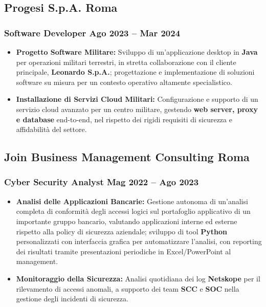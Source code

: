 \documentclass[11pt]{article}
\newcommand{\rside}[1]{
  \hfill {\normalfont\color{accent} #1}%
}
\begin{document}
\subsection{Progesi S.p.A. \rside{Roma}}
\subsubsection{Software Developer \rside{Ago 2023 -- Mar 2024}}
\begin{itemize}
  \item \textbf{Progetto Software Militare:} Sviluppo di un'applicazione desktop in \textbf{Java} per operazioni militari terrestri, in stretta collaborazione con il cliente principale, \textbf{Leonardo S.p.A.}; progettazione e implementazione di soluzioni software su misura per un contesto operativo altamente specialistico.
  \item \textbf{Installazione di Servizi Cloud Militari:} Configurazione e supporto di un servizio cloud avanzato per un centro militare, gestendo \textbf{web server, proxy e database} end-to-end, nel rispetto dei rigidi requisiti di sicurezza e affidabilità del settore.
\end{itemize}

\subsection{Join Business Management Consulting \rside{Roma}}
\subsubsection{Cyber Security Analyst \rside{Mag 2022 -- Ago 2023}}
\begin{itemize}
  \item \textbf{Analisi delle Applicazioni Bancarie:} Gestione autonoma di un'analisi completa di conformità degli accessi logici sul portafoglio applicativo di un importante gruppo bancario, valutando applicazioni interne ed esterne rispetto alla policy di sicurezza aziendale; sviluppo di tool \textbf{Python} personalizzati con interfaccia grafica per automatizzare l'analisi, con reporting dei risultati tramite presentazioni periodiche in Excel/PowerPoint al management.
  \item \textbf{Monitoraggio della Sicurezza:} Analisi quotidiana dei log \textbf{Netskope} per il rilevamento di accessi anomali, a supporto dei team \textbf{SCC} e \textbf{SOC} nella gestione degli incidenti di sicurezza.
\end{itemize}
\end{document}
